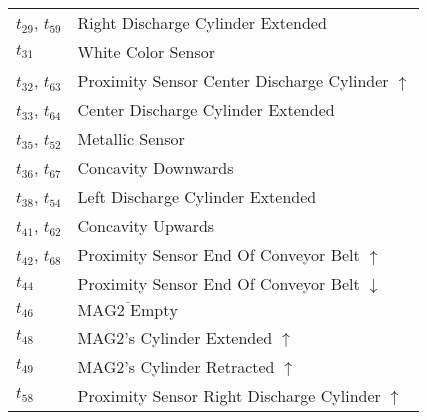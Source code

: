 \begin{longtable}{m{5cm}m{5cm}}
\hyperlink{completeNet:t29}{\hypertarget{completeTable:t29}{$t_{29}$}}, \hyperlink{completeNet:t59}{\hypertarget{completeTable:t59}{$t_{59}$}} & Right Discharge Cylinder Extended\\
\hyperlink{completeNet:t31}{\hypertarget{completeTable:t31}{$t_{31}$}} & White Color Sensor\\
\hyperlink{completeNet:t32}{\hypertarget{completeTable:t32}{$t_{32}$}}, \hyperlink{completeNet:t63}{\hypertarget{completeTable:t63}{$t_{63}$}} & Proximity Sensor Center Discharge Cylinder \(\uparrow\)\\
\hyperlink{completeNet:t33}{\hypertarget{completeTable:t33}{$t_{33}$}}, \hyperlink{completeNet:t64}{\hypertarget{completeTable:t64}{$t_{64}$}} & Center Discharge Cylinder Extended\\
\hyperlink{completeNet:t35}{\hypertarget{completeTable:t35}{$t_{35}$}}, \hyperlink{completeNet:t52}{\hypertarget{completeTable:t52}{$t_{52}$}} & Metallic Sensor\\
\hyperlink{completeNet:t36}{\hypertarget{completeTable:t36}{$t_{36}$}}, \hyperlink{completeNet:t67}{\hypertarget{completeTable:t67}{$t_{67}$}} & Concavity Downwards\\
\hyperlink{completeNet:t38}{\hypertarget{completeTable:t38}{$t_{38}$}}, \hyperlink{completeNet:t54}{\hypertarget{completeTable:t54}{$t_{54}$}} & Left Discharge Cylinder Extended\\
\hyperlink{completeNet:t41}{\hypertarget{completeTable:t41}{$t_{41}$}}, \hyperlink{completeNet:t62}{\hypertarget{completeTable:t62}{$t_{62}$}} & Concavity Upwards\\
\hyperlink{completeNet:t42}{\hypertarget{completeTable:t42}{$t_{42}$}}, \hyperlink{completeNet:t68}{\hypertarget{completeTable:t68}{$t_{68}$}} & Proximity Sensor End Of Conveyor Belt \(\uparrow\)\\
\hyperlink{completeNet:t44}{\hypertarget{completeTable:t44}{$t_{44}$}} & Proximity Sensor End Of Conveyor Belt \(\downarrow\)\\
\hyperlink{completeNet:t46}{\hypertarget{completeTable:t46}{$t_{46}$}} & \(\overline{\mbox{MAG2 Empty}}\)\\
\hyperlink{completeNet:t48}{\hypertarget{completeTable:t48}{$t_{48}$}} & MAG2's Cylinder Extended \(\uparrow\)\\
\hyperlink{completeNet:t49}{\hypertarget{completeTable:t49}{$t_{49}$}} & MAG2's Cylinder Retracted \(\uparrow\)\\
\hyperlink{completeNet:t58}{\hypertarget{completeTable:t58}{$t_{58}$}} & Proximity Sensor Right Discharge Cylinder \(\uparrow\)\\

\end{longtable}
